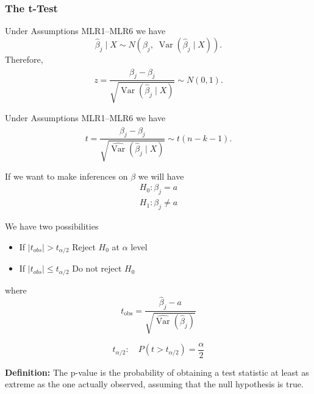 \vspace{10pt}

\subsubsection{The t-Test}

\begin{theorem}
Under Assumptions MLR1--MLR6 we have
\[
    \hat{\beta}_j \mid X \sim 
    N\!\left( 
        \beta_j,\;
        \operatorname{Var}\!\left( \hat{\beta}_j \mid X \right)
    \right).
\]
Therefore,
\[
    z = 
    \frac{
        \hat{\beta}_j - \beta_j
    }{
        \sqrt{\operatorname{Var}\!\left( \hat{\beta}_j \mid X \right)}
    }
    \sim N(0,1).
\]
\end{theorem}

\begin{theorem}
Under Assumptions MLR1--MLR6 we have
\[
    t = 
    \frac{
        \hat{\beta}_j - \beta_j
    }{
        \sqrt{\widehat{\operatorname{Var}}\!\left( \hat{\beta}_j \mid X \right)}
    }
    \sim t(n - k - 1).
\]
\end{theorem}

\vspace{10pt}

If we want to make inferences on $\beta$ we will have
\[
\begin{array}{l}
H_0 : \beta_j = a \\
H_1 : \beta_j \ne a
\end{array}
\]

We have two possibilities

\begin{itemize}
    \item If $|t_{obs}| > t_{\alpha/2}$ \ra Reject $H_0$ at $\alpha$ level
    \item If $|t_{obs}| \le t_{\alpha/2}$ \ra Do not reject $H_0$
\end{itemize}
where 
\[
t_{\text{obs}} =
\frac{\hat{\beta}_j - a}
{\sqrt{\widehat{\operatorname{Var}}\!\left( \hat{\beta}_j \right)}}
\]

\[
t_{\alpha/2} : \quad P(t > t_{\alpha/2}) = \frac{\alpha}{2}
\]

\textbf{Definition:} 
The p-value is the probability of obtaining a test statistic at least as extreme as the one actually observed, 
assuming that the null hypothesis is true.

